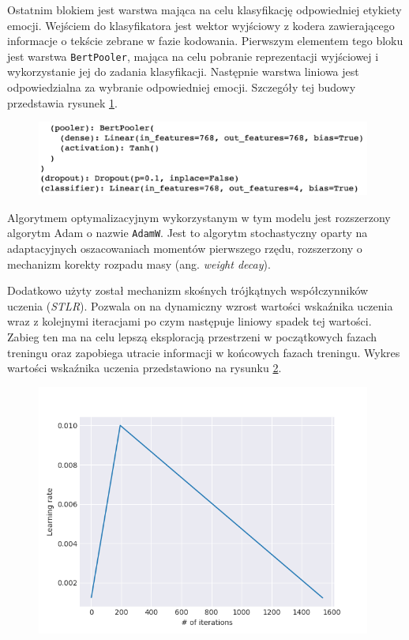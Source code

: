 Ostatnim blokiem jest warstwa mająca na celu klasyfikację odpowiedniej etykiety emocji. Wejściem do klasyfikatora jest wektor wyjściowy z kodera zawierającego informacje o tekście zebrane w fazie kodowania. Pierwszym elementem tego bloku jest warstwa \texttt{BertPooler}, mająca na celu pobranie reprezentacji wyjściowej i wykorzystanie jej do zadania klasyfikacji. Następnie warstwa liniowa jest odpowiedzialna za wybranie odpowiedniej emocji. Szczegóły tej budowy przedstawia rysunek \ref{rys:bert_classifier}.

\begin{figure}[t]
\centering\includegraphics[width=11cm]{figures/reports/bert_classifier.png}
\label{rys:bert_classifier}
\end{figure}

Algorytmem optymalizacyjnym wykorzystanym w tym modelu jest rozszerzony algorytm Adam \cite{kingma2014adam} o nazwie \texttt{AdamW}. Jest to algorytm stochastyczny oparty na adaptacyjnych oszacowaniach momentów pierwszego rzędu, rozszerzony o mechanizm korekty rozpadu masy (ang. \textit{weight decay}).

Dodatkowo użyty został mechanizm skośnych trójkątnych współczynników uczenia (\textit{STLR}). Pozwala on na dynamiczny wzrost wartości wskaźnika uczenia wraz z kolejnymi iteracjami po czym następuje liniowy spadek tej wartości. Zabieg ten ma na celu lepszą eksploracją przestrzeni w początkowych fazach treningu oraz zapobiega utracie informacji w końcowych fazach treningu. Wykres wartości wskaźnika uczenia przedstawiono na rysunku \ref{rys:trojkatne_wskazniki}.

\begin{figure}[t]
\centering\includegraphics[width=11cm]{figures/trojkatne_wskazniki.jpg}
\label{rys:trojkatne_wskazniki}
\end{figure}